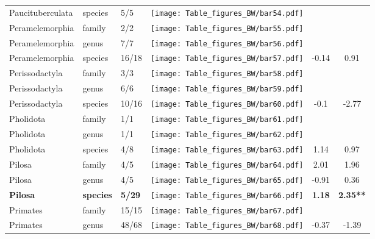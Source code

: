 \begin{longtable}{lL{1.8cm}C{2cm}lcc}
  Paucituberculata & species & 5/5 & \texttt{[image: Table\_figures\_BW/bar54.pdf]} &   &   \\ 
  Peramelemorphia & family & 2/2 & \texttt{[image: Table\_figures\_BW/bar55.pdf]} &   &   \\ 
  Peramelemorphia & genus & 7/7 & \texttt{[image: Table\_figures\_BW/bar56.pdf]} &   &   \\ 
  Peramelemorphia & species & 16/18 & \texttt{[image: Table\_figures\_BW/bar57.pdf]} & -0.14 & 0.91 \\ 
  Perissodactyla & family & 3/3 & \texttt{[image: Table\_figures\_BW/bar58.pdf]} &   &   \\ 
  Perissodactyla & genus & 6/6 & \texttt{[image: Table\_figures\_BW/bar59.pdf]} &   &   \\ 
  Perissodactyla & species & 10/16 & \texttt{[image: Table\_figures\_BW/bar60.pdf]} & -0.1 & -2.77 \\ 
  Pholidota & family & 1/1 & \texttt{[image: Table\_figures\_BW/bar61.pdf]} &   &   \\ 
  Pholidota & genus & 1/1 & \texttt{[image: Table\_figures\_BW/bar62.pdf]} &   &   \\ 
  Pholidota & species & 4/8 & \texttt{[image: Table\_figures\_BW/bar63.pdf]} & 1.14 & 0.97 \\ 
  Pilosa & family & 4/5 & \texttt{[image: Table\_figures\_BW/bar64.pdf]} & 2.01 & 1.96 \\ 
  Pilosa & genus & 4/5 & \texttt{[image: Table\_figures\_BW/bar65.pdf]} & -0.91 & 0.36 \\ 
  \textbf{Pilosa} & \textbf{species} & \textbf{5/29} & \texttt{[image: Table\_figures\_BW/bar66.pdf]} & \textbf{1.18} & \textbf{2.35**} \\ 
  Primates & family & 15/15 & \texttt{[image: Table\_figures\_BW/bar67.pdf]} &   &   \\ 
  Primates & genus & 48/68 & \texttt{[image: Table\_figures\_BW/bar68.pdf]} & -0.37 & -1.39 \\ 

\end{longtable}
